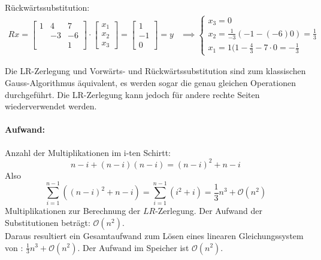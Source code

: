\begin{example}
Rückwärtssubstitution:
\begin{align*}
	Rx= \begin{bmatrix}
		1 & 4 & 7 \\
		  & -3 & -6 \\
		  & & 1
	\end{bmatrix}
	\cdot 
	\begin{bmatrix}
	x_1 \\ x_2 \\ x_3
	\end{bmatrix}
	= \begin{bmatrix}
	1 \\ -1 \\ 0
	\end{bmatrix} = y
	&\implies \begin{cases}
		x_3 = 0 \\
		x_2= \frac{1}{-3}(-1-(-6) 0) =\frac{1}{3} \\
		x_1= 1(1-\frac{4}{3}-7\cdot 0 = -\frac{1}{3}
	\end{cases}
\end{align*}
\end{example}
\begin{remark}
Die LR-Zerlegung und Vorwärts- und Rückwärtssubstitution sind zum klassischen Gauss-Algorithmus äquivalent, es werden sogar die genau gleichen Operationen durchgeführt. Die LR-Zerlegung kann jedoch für andere rechte Seiten wiederverwendet werden.
\end{remark}
\paragraph{Aufwand:} Anzahl der Multiplikationen im i-ten Schirtt:
\[
n-i + (n-i) (n-i) = (n-i)^2 + n-i
\]
Also 
\[
\sum_{i=1}^{n-1}\left( (n-i)^2 + n-i \right)= \sum_{i=1}^{n-1}\left( i^2+i \right)= \frac{1}{3}n^3 + \mathcal{O}(n^2)
\]
Multiplikationen zur Berechnung der $LR$-Zerlegung.
Der Aufwand der Substitutionen beträgt: $\mathcal{O}(n^2)$. \\
Daraus resultiert ein Gesamtaufwand zum Lösen eines linearen Gleichungssystem von : $\frac{1}{3}n^3+\mathcal{O}(n^2)$. Der Aufwand im Speicher ist $\mathcal{O}(n^2)$.
